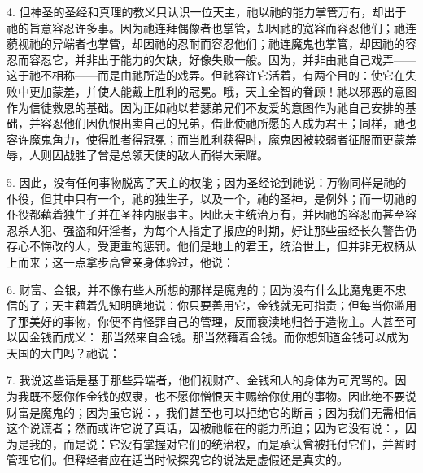 4. 但神圣的圣经和真理的教义只认识一位天主，祂以祂的能力掌管万有，却出于祂的旨意容忍许多事。因为祂连拜偶像者也掌管，却因祂的宽容而容忍他们；祂连藐视祂的异端者也掌管，却因祂的忍耐而容忍他们；祂连魔鬼也掌管，却因祂的容忍而容忍它，并非出于能力的欠缺，好像失败一般。因为，并非由祂自己戏弄——这于祂不相称——而是由祂所造的戏弄。但祂容许它活着，有两个目的：使它在失败中更加蒙羞，并使人能戴上胜利的冠冕。哦，天主全智的眷顾！祂以邪恶的意图作为信徒救恩的基础。因为正如祂以若瑟弟兄们不友爱的意图作为祂自己安排的基础，并容忍他们因仇恨出卖自己的兄弟，借此使祂所愿的人成为君王；同样，祂也容许魔鬼角力，使得胜者得冠冕；而当胜利获得时，魔鬼因被较弱者征服而更蒙羞辱，人则因战胜了曾是总领天使的敌人而得大荣耀。\par

5. 因此，没有任何事物脱离了天主的权能；因为圣经论到祂说：万物同样是祂的仆役，但其中只有一个，祂的独生子，以及一个，祂的圣神，是例外；而一切祂的仆役都藉着独生子并在圣神内服事主。因此天主统治万有，并因祂的容忍而甚至容忍杀人犯、强盗和奸淫者，为每个人指定了报应的时期，好让那些虽经长久警告仍存心不悔改的人，受更重的惩罚。他们是地上的君王，统治世上，但并非无权柄从上而来；这一点拿步高曾亲身体验过，他说：\par

6. 财富、金银，并不像有些人所想的那样是魔鬼的；因为没有什么比魔鬼更不忠信的了；天主藉着先知明确地说：你只要善用它，金钱就无可指责；但每当你滥用了那美好的事物，你便不肯怪罪自己的管理，反而亵渎地归咎于造物主。人甚至可以因金钱而成义： 那当然来自金钱。那当然藉着金钱。而你想知道金钱可以成为天国的大门吗？祂说：\par

7. 我说这些话是基于那些异端者，他们视财产、金钱和人的身体为可咒骂的。因为我既不愿你作金钱的奴隶，也不愿你憎恨天主赐给你使用的事物。因此绝不要说财富是魔鬼的；因为虽它说：，我们甚至也可以拒绝它的断言；因为我们无需相信这个说谎者；然而或许它说了真话，因被祂临在的能力所迫；因为它没有说：，因为是我的，而是说：它没有掌握对它们的统治权，而是承认曾被托付它们，并暂时管理它们。但释经者应在适当时候探究它的说法是虚假还是真实的。\par

